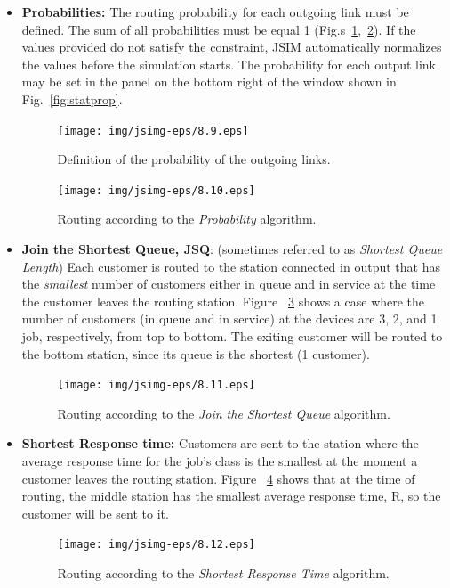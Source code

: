 \begin{itemize}
\item \textbf{Probabilities:} The routing probability for each
outgoing link must be defined. The sum of all probabilities must
be equal 1 (Fig.s~\ref{fig:defprobw},~\ref{fig:routexe}). If the
values provided do not satisfy the constraint, JSIM automatically
normalizes the values before the simulation starts. The
probability for each output link may be set in the panel on the
bottom right of the window shown in Fig.~\ref{fig:statprop}.
\begin{figure}[h!]
    \begin{center}
        \texttt{[image: img/jsimg-eps/8.9.eps]}
    \end{center}
    \caption{Definition of the probability of the outgoing links.}
    \label{fig:defprobw}
\end{figure}
\begin{figure}[h!]
    \begin{center}
        \texttt{[image: img/jsimg-eps/8.10.eps]}
    \end{center}
    \caption{Routing according to the \emph{Probability} algorithm.}
    \label{fig:routexe}
\end{figure}
\item \textbf{Join the Shortest Queue, JSQ}: (sometimes referred
to as \emph{Shortest Queue Length}) Each customer is routed to the
station connected in output that has the \emph{smallest} number of
customers either in queue and in service at the time the customer
leaves the routing station. Figure ~\ref{fig:routsql} shows a case
where the number of customers (in queue and in service) at the
devices are 3, 2, and 1 job, respectively, from top to bottom. The
exiting customer will be routed to the bottom station, since its
queue is the shortest (1 customer).
\begin{figure}[htb]
    \begin{center}
        \texttt{[image: img/jsimg-eps/8.11.eps]}
    \end{center}
    \caption{Routing according to the \emph{Join the Shortest Queue} algorithm.}
    \label{fig:routsql}
\end{figure}
\item \textbf{Shortest Response time:} Customers are sent to the
station where the average response time for the job's class is the
smallest at the moment a customer leaves the routing station.
Figure ~\ref{fig:routstrespt} shows that at the time of routing,
the middle station has the smallest average response time, R, so
the customer will be sent to it.
\begin{figure}[htb]
    \begin{center}
        \texttt{[image: img/jsimg-eps/8.12.eps]}
    \end{center}
    \caption{Routing according to the \emph{Shortest Response Time} algorithm.}
    \label{fig:routstrespt}
\end{figure}


\end{itemize}

